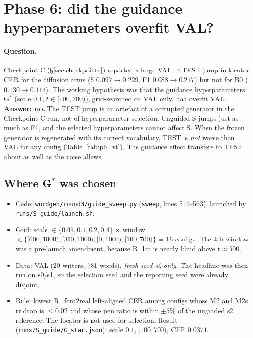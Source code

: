 \documentclass[10.5pt,a4paper]{article}
\newcommand{\fp}[1]{\nolinkurl{#1}}
\begin{document}
\section{Phase 6: did the guidance hyperparameters overfit VAL?}
\label{sec:p6}

\paragraph{Question.} Checkpoint C (\S\ref{sec:checkpointc}) reported a large VAL$\to$TEST jump in locator CER for the
diffusion arms (S $0.097\to0.229$, F1 $0.088\to0.217$) but not for B0 ($0.130\to0.114$). The working hypothesis was
that the guidance hyperparameters G$^*$ (scale $0.1$, $t\in[100,700)$), grid-searched on VAL only, had overfit VAL.
\textbf{Answer: no.} The TEST jump is an artefact of a corrupted generator in the Checkpoint C run, not of
hyperparameter selection. Unguided S jumps just as much as F1, and the selected hyperparameters cannot affect S. When
the frozen generator is regenerated with its correct vocabulary, TEST is \emph{not} worse than VAL for any config
(Table~\ref{tab:p6_vt}). The guidance effect transfers to TEST about as well as the noise allows.

\subsection{Where G$^*$ was chosen}
\begin{itemize}[nosep]
\item Code: \fp{wordgen/round3/guide_sweep.py} (\texttt{sweep}, lines 514--563), launched by \fp{runs/S_guide/launch.sh}.
\item Grid: scale $\in\{0.05,0.1,0.2,0.4\}$ $\times$ window $\in\{[600,1000),[300,1000),[0,1000),[100,700)\}$ = 16 configs.
The 4th window was a pre-launch amendment, because R\_lat is nearly blind above $t\approx600$.
\item Data: VAL (20 writers, 781 words), \emph{fresh seed s2 only}. The headline was then run on s0/s1, so the selection
seed and the reporting seed were already disjoint.
\item Rule: lowest R\_font2real left-aligned CER among configs whose M2 and M2s rr drop is $\le0.02$ and whose pen ratio is
within $\pm5\%$ of the unguided s2 reference. The locator is not used for selection. Result
(\fp{runs/S_guide/G_star.json}): scale $0.1$, $[100,700)$, CER $0.0371$.
\end{itemize}
\end{document}
